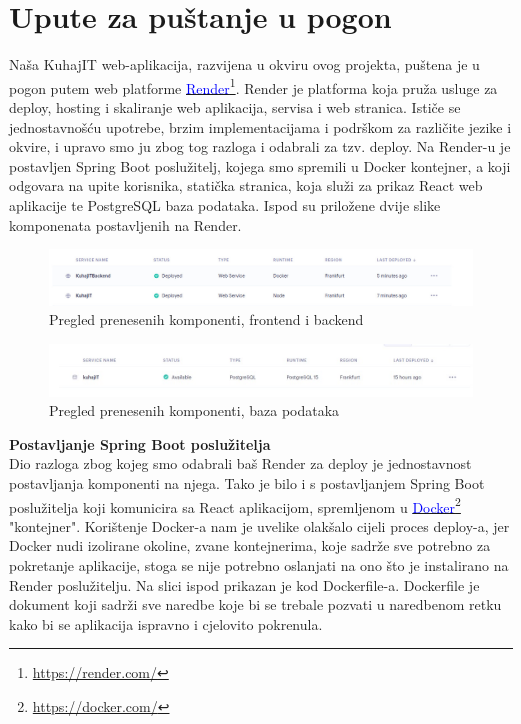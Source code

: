		

			\eject 
		
		\section{Upute za puštanje u pogon}
		Naša KuhajIT web-aplikacija, razvijena u okviru ovog projekta, puštena je u pogon putem web platforme  \textcolor{blue}{\underline{\href{https://render.com/}{\textcolor{blue}{Render}}}}\footnote{\url{https://render.com/}}. Render je platforma koja pruža usluge za deploy, hosting i skaliranje web aplikacija, servisa i web stranica. Ističe se jednostavnošću upotrebe, brzim implementacijama i podrškom za različite jezike i okvire, i upravo smo ju zbog tog razloga i odabrali za tzv. deploy. Na Render-u je postavljen Spring Boot poslužitelj, kojega smo spremili u Docker kontejner, a koji odgovara na upite korisnika, statička stranica, koja služi za prikaz React web aplikacije te PostgreSQL baza podataka. Ispod su priložene dvije slike komponenata postavljenih na Render.
		
		
			\begin{figure}[H]
			\includegraphics[scale=0.3]{slike/Render_OVERVIEW.JPG} %
			\centering
			\caption{Pregled prenesenih komponenti, frontend i backend}
			\label{Pregled prenesenih komponenti, frontend i backend}
		\end{figure}
		
					\begin{figure}[H]
			\includegraphics[scale=0.3]{slike/Render_OVERVIEW_DATABASE.JPG} %
			\centering
			\caption{Pregled prenesenih komponenti, baza podataka}
			\label{Pregled prenesenih komponenti, baza podataka}
		\end{figure}
		
		
		
		\textbf{Postavljanje Spring Boot poslužitelja} \\
		Dio razloga zbog kojeg smo odabrali baš Render za deploy je jednostavnost postavljanja komponenti na njega. Tako je bilo i s postavljanjem Spring Boot poslužitelja koji komunicira sa React aplikacijom, spremljenom u \textcolor{blue}{\underline{\href{https://docker.com/}{\textcolor{blue}{Docker}}}}\footnote{\url{https://docker.com/}} "kontejner". Korištenje Docker-a nam je uvelike olakšalo cijeli proces deploy-a, jer Docker nudi izolirane okoline, zvane kontejnerima, koje sadrže sve potrebno za pokretanje aplikacije, stoga se nije potrebno oslanjati na ono što je instalirano na Render poslužitelju. Na slici ispod prikazan je kod Dockerfile-a. Dockerfile je dokument koji sadrži sve naredbe koje bi se trebale pozvati u naredbenom retku kako bi se aplikacija ispravno i cjelovito pokrenula.
		
